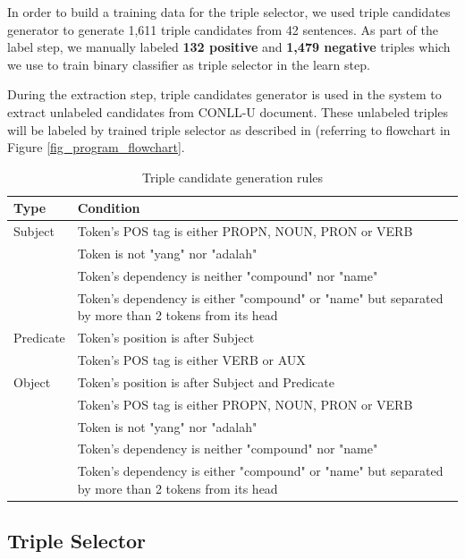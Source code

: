 \documentclass[conference,compsoc]{IEEEtran}
\begin{document}
In order to build a training data for the triple selector, we used triple candidates generator to generate 1,611 triple candidates from 42 sentences. As part of the label step, we manually labeled \textbf{132 positive} and \textbf{1,479 negative} triples which we use to train binary classifier as triple selector in the learn step.

During the extraction step, triple candidates generator is used in the system to extract unlabeled candidates from CONLL-U document. These unlabeled triples will be labeled by trained triple selector as described in  (referring to flowchart in Figure \ref{fig_program_flowchart}.

\begin{table}[!t]
\renewcommand{\arraystretch}{1.5}
\caption{Triple candidate generation rules}
\label{table_triple_candidate_generation_rules}
\centering
\begin{tabular}{l|p{6cm}}
\hline
\textbf{Type} & \textbf{Condition} \\
\hline
Subject & Token's POS tag is either PROPN, NOUN, PRON or VERB \\
\space & Token is not "yang" nor "adalah" \\
\space & Token's dependency is neither "compound" nor "name" \\
\space & Token's dependency is either "compound" or "name" but separated by more than 2 tokens from its head \\
\hline
Predicate & Token's position is after Subject \\
\space & Token's POS tag is either VERB or AUX \\
\hline
Object & Token's position is after Subject and Predicate \\
\space & Token's POS tag is either PROPN, NOUN, PRON or VERB \\
\space & Token is not "yang" nor "adalah" \\
\space & Token's dependency is neither "compound" nor "name" \\
\space & Token's dependency is either "compound" or "name" but separated by more than 2 tokens from its head \\
\end{tabular}
\end{table}


\subsection{Triple Selector}  \label{Triple Selector}
\end{document}
